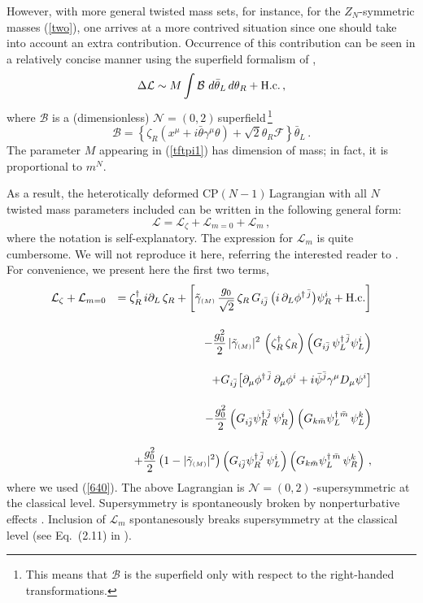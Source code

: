 \documentclass[epsfig,12pt]{article}
\def\beq{\begin{equation}}
\def\eeq{\end{equation}}
\def\beqn{\begin{eqnarray}}
\def\eeqn{\end{eqnarray}}
\newcommand{\nzt}{${\mathcal N}=(0,2)\,$}
\newcommand{\cpn}{CP$(N-1)\,$}
\newcommand{\cell}{{\mathcal L}}
\newcommand{\zn}{$Z_N$}
\def\beqn{\begin{eqnarray}}
\def\eeqn{\end{eqnarray}}
\def\beq{\begin{equation}}
\def\eeq{\end{equation}}
\newcommand{\ssm}{{\scriptscriptstyle(M)}}
\begin{document}
However, with more general twisted mass sets,
for instance, for the \zn-symmetric masses (\ref{two}), 
one arrives at a more contrived situation since 
one should take into account an extra contribution.
Occurrence of this contribution can be seen \cite{BSY3} in a relatively concise
manner using the superfield formalism of \cite{SY1},
\beq
\Delta\cell \sim M\int  {\mathcal B}\,\,  d\bar\theta_L \, d\theta_R + {\rm H. c.}\,,
\label{tftpi1}
\eeq
where
${\mathcal B}$ is a (dimensionless) \nzt superfield\,\footnote{This means that ${\mathcal B}$
is the superfield only with respect to the right-handed transformations.}
\beq
{\mathcal B} =\left\{\zeta_R\left(x^\mu + i\bar\theta\gamma^\mu\theta\right) +\sqrt{2} \theta_R {\mathcal F}
\right\} \bar\theta_L\,.
\label{tftpi2}
\eeq
 The parameter $M$ appearing in (\ref{tftpi1}) has dimension of mass; in fact, it is proportional to $m^N$.
 
 As a result, the heterotically deformed \cpn Lagrangian with all $N$ twisted mass parameters included
can be written in the following general form:
 \beq
 \cell = \cell_\zeta + \cell_{m=0} +\cell_m\,,
 \label{tftpi3}
 \eeq
 where the notation is self-explanatory. The expression for $\cell_m$ is quite cumbersome.
 We will not reproduce it here, referring the interested reader to \cite{BSY3}.
 For convenience, we present here the first two terms,
\beqn
\cell_\zeta + \cell_{m=0} && 
= 
\zeta_R^\dagger \, i\partial_L \, \zeta_R  + 
\left[\tilde\gamma_\ssm\, \frac{g_0}{\sqrt 2} \, \zeta_R  \, 
      G_{i\bar j}\,  \big( i\,\partial_{L}\phi^{\dagger\,\bar j} \big)\psi_R^i
      + {\rm H.c.}\right]
\nonumber
\\[4mm]
&&
 -\frac{g_0^2}{2}\, |\tilde\gamma_\ssm |^2 \,\left(\zeta_R^\dagger\, \zeta_R
\right)\left(G_{i\bar j}\,  \psi_L^{\dagger\,\bar j}\psi_L^i\right)
\nonumber
\\[4mm]
&&
+G_{i\bar j} \big[\partial_\mu \phi^{\dagger\,\bar j}\, \partial_\mu\phi^{i}
+i\bar \psi^{\bar j} \gamma^{\mu} D_{\mu}\psi^{i}\big]
\nonumber
\\[4mm]
&&
- \frac{g_0^2}{2}\left( G_{i\bar j}\psi^{\dagger\, \bar j}_R\, \psi^{ i}_R\right)
\left( G_{k\bar m}\psi^{\dagger\, \bar m}_L\, \psi^{ k}_L\right)
\nonumber
\\[4mm]
&&
+\frac{g_0^2}{2}\left(1-|\tilde\gamma_\ssm|^2\right)
\left( G_{i\bar j}\psi^{\dagger\, \bar j}_R\, \psi^{ i}_L\right)
\left( G_{k\bar m}\psi^{\dagger\, \bar m}_L\, \psi^{ k}_R\right)\,,
\label{cpn-1g}
\eeqn
where we used (\ref{640}). The above Lagrangian is \nzt-supersymmetric at the classical level.
Supersymmetry is spontaneously broken by nonperturbative effects \cite{EdTo,SYhet}. 
Inclusion of $\cell_m$ spontanesously breaks supersymmetry at the classical level (see
Eq.~(2.11) in \cite{BSY3}).
\end{document}
